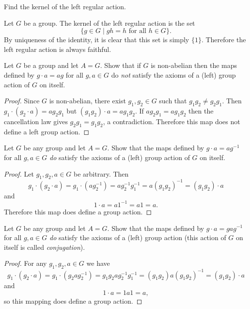  Find the kernel of the left regular action.
\begin{solution}
  Let $G$ be a group. The kernel of the left regular action is the set
  \begin{equation*}
    \{g\in G\mid \text{$gh = h$ for all $h\in G$}\}.
  \end{equation*}
  By uniqueness of the identity, it is clear that this set is simply
  $\{1\}$. Therefore the left regular action is always faithful.
\end{solution}

 Let $G$ be a group and let $A = G$. Show that if $G$ is
non-abelian then the maps defined by $g\cdot a = ag$ for all
$g,a\in G$ do {\em not} satisfy the axioms of a (left) group action of
$G$ on itself.
\begin{proof}
  Since $G$ is non-abelian, there exist $g_1,g_2\in G$ such that
  $g_1g_2 \neq g_2g_1$. Then $g_1\cdot(g_2\cdot a) = ag_2g_1$ but
  $(g_1g_2)\cdot a = ag_1g_2$. If $ag_2g_1 = ag_1g_2$ then the
  cancellation law gives $g_2g_1 = g_1g_2$, a contradiction. Therefore
  this map does not define a left group action.
\end{proof}

 Let $G$ be any group and let $A = G$. Show that the maps
defined by $g\cdot a = ag^{-1}$ for all $g,a\in G$ {\em do} satisfy
the axioms of a (left) group action of $G$ on itself.
\begin{proof}
  Let $g_1,g_2,a\in G$ be arbitrary. Then
  \begin{equation*}
    g_1\cdot(g_2\cdot a) = g_1\cdot(ag_2^{-1})
    = ag_2^{-1}g_1^{-1} = a(g_1g_2)^{-1} = (g_1g_2)\cdot a
  \end{equation*}
  and
  \begin{equation*}
    1\cdot a = a1^{-1} = a1 = a.
  \end{equation*}
  Therefore this map does define a group action.
\end{proof}

 Let $G$ be any group and let $A = G$. Show that the maps
defined by $g\cdot a = gag^{-1}$ for all $g,a\in G$ {\em do} satisfy
the axioms of a (left) group action (this action of $G$ on itself is
called {\em conjugation}).
\begin{proof}
  For any $g_1,g_2,a\in G$ we have
  \begin{equation*}
    g_1\cdot(g_2\cdot a) = g_1\cdot(g_2ag_2^{-1})
    = g_1g_2ag_2^{-1}g_1^{-1} = (g_1g_2)a(g_1g_2)^{-1}
    = (g_1g_2)\cdot a
  \end{equation*}
  and
  \begin{equation*}
    1\cdot a = 1a1 = a,
  \end{equation*}
  so this mapping does define a group action.
\end{proof}

